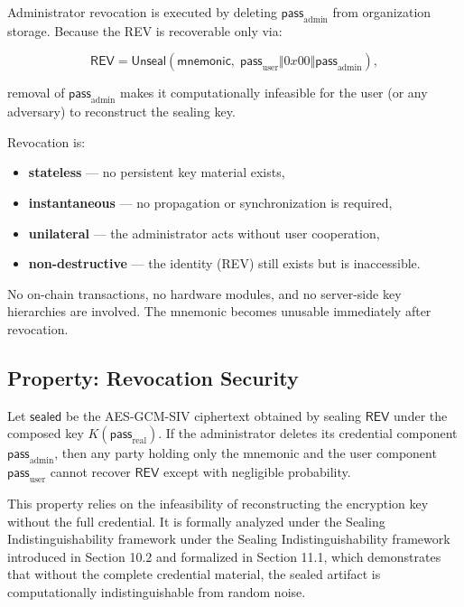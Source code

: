 \documentclass[12pt,a4paper]{article}
\begin{document}
  Administrator revocation is executed by deleting
  $\mathsf{pass}_{\mathrm{admin}}$ from organization storage.
  Because the REV is recoverable only via:

  \[
   \mathsf{REV}
   = \mathsf{Unseal}(\mathsf{mnemonic},\;
   \mathsf{pass}_{\mathrm{user}} \Vert 0x00 \Vert \mathsf{pass}_{\mathrm{admin}}),
  \]

  removal of $\mathsf{pass}_{\mathrm{admin}}$ makes it computationally infeasible for the
  user (or any adversary) to reconstruct the sealing key.

  Revocation is:

  \begin{itemize}
   \item \textbf{stateless} --- no persistent key material exists,
   \item \textbf{instantaneous} --- no propagation or synchronization is required,
   \item \textbf{unilateral} --- the administrator acts without user cooperation,
   \item \textbf{non-destructive} --- the identity (REV) still exists but is inaccessible.
  \end{itemize}

  No on-chain transactions, no hardware modules, and no server-side key hierarchies
  are involved. The mnemonic becomes unusable immediately after revocation.

  \subsection{Property: Revocation Security}

  Let $\mathsf{sealed}$ be the AES-GCM-SIV ciphertext obtained by sealing $\mathsf{REV}$ under the composed key $K(\mathsf{pass}_{\mathrm{real}})$. If the administrator deletes its credential component $\mathsf{pass}_{\mathrm{admin}}$, then any party holding only the mnemonic and the user component $\mathsf{pass}_{\mathrm{user}}$ cannot recover $\mathsf{REV}$ except with negligible probability.

  This property relies on the infeasibility of reconstructing the encryption key without the full credential. It is formally analyzed under the Sealing Indistinguishability framework under the Sealing Indistinguishability framework introduced in Section 10.2 and formalized in Section 11.1, which demonstrates that without the complete credential material, the sealed artifact is computationally indistinguishable from random noise.
\end{document}
